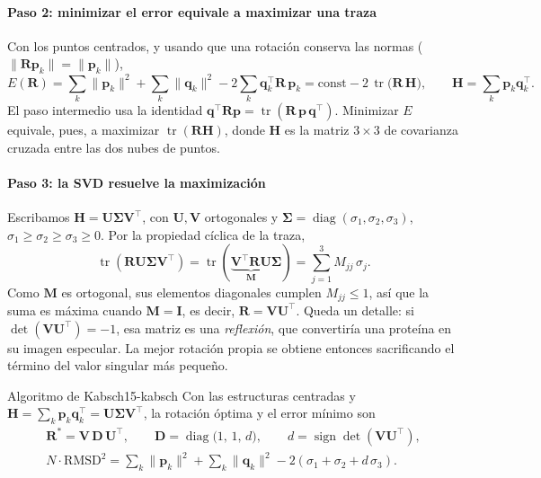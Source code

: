 \paragraph{Paso 2: minimizar el error equivale a maximizar una traza} Con los puntos centrados, y usando que una rotación conserva las normas ($\lVert\mathbf R\mathbf p_k\rVert=\lVert\mathbf p_k\rVert$),
\begin{equation}\label{eq:15-traza}
E(\mathbf R)=\sum_k\lVert\mathbf p_k\rVert^2+\sum_k\lVert\mathbf q_k\rVert^2-2\sum_k\mathbf q_k^\top\mathbf R\,\mathbf p_k
=\text{const}-2\,\operatorname{tr}\!\big(\mathbf R\,\mathbf H\big),
\qquad \mathbf H=\sum_k \mathbf p_k\mathbf q_k^\top.
\end{equation}
El paso intermedio usa la identidad $\mathbf q^\top\mathbf R\mathbf p=\operatorname{tr}(\mathbf R\,\mathbf p\,\mathbf q^\top)$. Minimizar $E$ equivale, pues, a maximizar $\operatorname{tr}(\mathbf R\mathbf H)$, donde $\mathbf H$ es la matriz $3\times3$ de covarianza cruzada entre las dos nubes de puntos.

\paragraph{Paso 3: la SVD resuelve la maximización} Escribamos $\mathbf H=\mathbf U\boldsymbol\Sigma\mathbf V^\top$, con $\mathbf U,\mathbf V$ ortogonales y $\boldsymbol\Sigma=\operatorname{diag}(\sigma_1,\sigma_2,\sigma_3)$, $\sigma_1\ge\sigma_2\ge\sigma_3\ge0$. Por la propiedad cíclica de la traza,
\[
\operatorname{tr}(\mathbf R\mathbf U\boldsymbol\Sigma\mathbf V^\top)=\operatorname{tr}(\underbrace{\mathbf V^\top\mathbf R\mathbf U}_{\mathbf M}\boldsymbol\Sigma)=\sum_{j=1}^3 M_{jj}\,\sigma_j .
\]
Como $\mathbf M$ es ortogonal, sus elementos diagonales cumplen $M_{jj}\le1$, así que la suma es máxima cuando $\mathbf M=\mathbf I$, es decir, $\mathbf R=\mathbf V\mathbf U^\top$. Queda un detalle: si $\det(\mathbf V\mathbf U^\top)=-1$, esa matriz es una \emph{reflexión}, que convertiría una proteína en su imagen especular. La mejor rotación propia se obtiene entonces sacrificando el término del valor singular más pequeño.

\begin{teorema}{Algoritmo de Kabsch}{15-kabsch}
Con las estructuras centradas y $\mathbf H=\sum_k\mathbf p_k\mathbf q_k^\top=\mathbf U\boldsymbol\Sigma\mathbf V^\top$, la rotación óptima y el error mínimo son
\begin{gather}
\mathbf R^\ast=\mathbf V\,\mathbf D\,\mathbf U^\top,\qquad
\mathbf D=\operatorname{diag}\big(1,\,1,\,d\big),\qquad d=\operatorname{sign}\det(\mathbf V\mathbf U^\top),\label{eq:15-kabsch}\\
N\cdot\mathrm{RMSD}^2=\sum_k\lVert\mathbf p_k\rVert^2+\sum_k\lVert\mathbf q_k\rVert^2-2(\sigma_1+\sigma_2+d\,\sigma_3).\nonumber
\end{gather}
\end{teorema}


